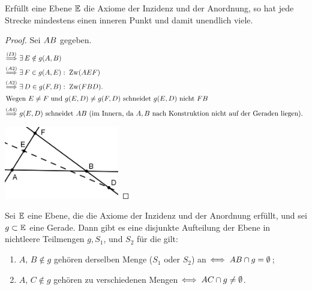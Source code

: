 \begin{thm}
    Erfüllt eine Ebene $\mathbb E$ die Axiome der Inzidenz und der Anordnung, so hat jede Strecke
    mindestens einen inneren Punkt und damit unendlich viele.
\end{thm}

\begin{proof}
    Sei ${AB}$ gegeben.
    \begin{align*}
        \stackrel{(I3)}{\Longrightarrow}\ & \exists\,E\notin g(A,B)\\
        \stackrel{(A2)}{\Longrightarrow}\ & \exists\,F\in g(A,E):\;\operatorname{Zw}(AEF)\\
        \stackrel{(A2)}{\Longrightarrow}\ & \exists\,D\in g(F,B):\;\operatorname{Zw}(FBD).\\
        \intertext{Wegen $E\neq F$ und $g(E,D)\neq g(F,D)$ schneidet $g(E,D)$ nicht ${FB}$}
        \stackrel{(A4)}{\Longrightarrow}\ & g(E,D) \text{ schneidet } {AB} \text{ (im Innern, da
        $A,B$ nach Konstruktion nicht auf der Geraden liegen). }
    \end{align*}

    \centerline{\includegraphics[width=5cm]{BILDER/1-1-05-Satz.png}}
\end{proof}


\begin{thm}\label{thm:satz.s1a}
    Sei $\mathbb E$ eine Ebene, die die Axiome der Inzidenz und der Anordnung erfüllt, und sei $g \subset
    \mathbb E$ eine Gerade. Dann gibt es eine disjunkte Aufteilung der Ebene in nichtleere Teilmengen $g,
    S_1$, und $S_2$ für die gilt:

    \renewcommand{\labelenumi}{\alph{enumi})} %
    \begin{enumerate}
        \item $A,\, B \notin g$ gehören derselben Menge ($S_1$ oder $S_2$) an
            $\Longleftrightarrow\; {AB} \cap g = \emptyset$;

        \item $A,\, C \notin g$ gehören zu verschiedenen Mengen $\Longleftrightarrow\;
            {AC} \cap g \neq \emptyset$.
    \end{enumerate}
\end{thm}

